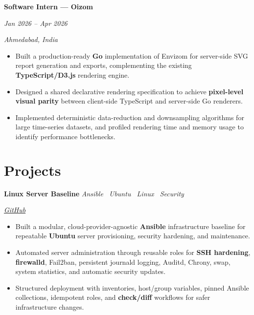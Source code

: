 \documentclass[10pt,a4paper]{article}
\newcommand{\datedentry}[2]{%
    \noindent
    \begin{minipage}[t]{0.72\linewidth}
        \raggedright
        \textbf{#1}
    \end{minipage}%
    \hfill
    \begin{minipage}[t]{0.25\linewidth}
        \raggedleft
        \textit{\color{textgray}#2}
    \end{minipage}%
    \par
}
\newcommand{\projectentry}[3]{%
    \noindent
    \begin{minipage}[t]{0.62\linewidth}
        \raggedright
        \textbf{#1}
        \hspace{0.7em}
        \textit{\color{textgray}#2}
    \end{minipage}%
    \hfill
    \begin{minipage}[t]{0.34\linewidth}
        \raggedleft
        \itshape\color{textgray}#3
    \end{minipage}%
    \par
}
\begin{document}
\datedentry
    {Software Intern --- Oizom}
    {Jan 2026 -- Apr 2026}

\vspace{1.5pt}

{\fontsize{10}{12}\selectfont
\itshape\color{textgray}
Ahmedabad, India
}

\vspace{2pt}

\begin{itemize}
    \item Built a production-ready \textbf{Go} implementation of Envizom for server-side SVG report generation and exports, complementing the existing \textbf{TypeScript/D3.js} rendering engine.

    \item Designed a shared declarative rendering specification to achieve \textbf{pixel-level visual parity} between client-side TypeScript and server-side Go renderers.

    \item Implemented deterministic data-reduction and downsampling algorithms for large time-series datasets, and profiled rendering time and memory usage to identify performance bottlenecks.
\end{itemize}

\section*{Projects}

\projectentry
    {Linux Server Baseline}
    {Ansible \textperiodcentered\ Ubuntu \textperiodcentered\ Linux \textperiodcentered\ Security}
    {\href{https://github.com/Kishan-Thanki/linux-server-baseline}{GitHub}}

\vspace{2pt}

\begin{itemize}
    \item Built a modular, cloud-provider-agnostic \textbf{Ansible} infrastructure baseline for repeatable \textbf{Ubuntu} server provisioning, security hardening, and maintenance.

    \item Automated server administration through reusable roles for \textbf{SSH hardening}, \textbf{firewalld}, Fail2ban, persistent journald logging, Auditd, Chrony, swap, system statistics, and automatic security updates.

    \item Structured deployment with inventories, host/group variables, pinned Ansible collections, idempotent roles, and \textbf{check/diff} workflows for safer infrastructure changes.
\end{itemize}
\end{document}
